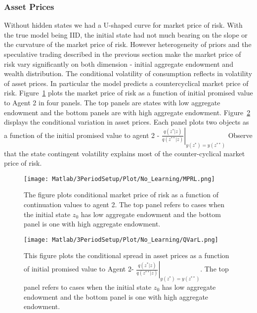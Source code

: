 \documentclass[12pt]{article}
\begin{document}
\subsubsection{Asset Prices}
\noindent Without hidden states we had a U-shaped curve for market price of risk. With the true model being IID, the initial state had not much bearing on the slope or the curvature of the market price of risk. However heterogeneity of priors and the speculative trading described in the previous section make the market price of risk vary significantly on both dimension - initial aggregate endowment and wealth distribution. The conditional volatility of consumption reflects in volatility of asset prices. In particular the model predicts a countercyclical market price of risk. Figure~\ref{fig:MPRL} plots the market price of risk as a function of initial promised value to Agent 2 in four panels. The top panels are states with low aggregate endowment and the bottom panels are with high aggregate endowment. Figure~\ref{fig:QVarL} displays the conditional variation in asset prices. Each panel plots two objects as a function of the initial promised value to agent 2 -  $ \left.\frac{q(z^*|z)}{q(z^{**}|z)}\right|_{y(z^*)=y(z^{**})}$ Observe that the state contingent volatility explains most of the counter-cyclical market price of risk.
\begin{figure}[htbp]
\centering
	  \texttt{[image: Matlab/3PeriodSetup/Plot/No\_Learning/MPRL.png]}

	\caption{ The figure plots conditional market price of risk as a function of continuation values to agent 2. The top panel refers to cases when the initial state $z_0$ has low aggregate endowment and the bottom panel is one with high aggregate endowment.}
	\label{fig:MPRL}
\end{figure} 
\begin{figure}[htbp]
\centering
	  \texttt{[image: Matlab/3PeriodSetup/Plot/No\_Learning/QVarL.png]}

	\caption{This figure plots the conditional spread in asset prices as a function of initial promised value to Agent 2-  $ \left.\frac{q(z^*|z)}{q(z^{**}|z)}\right|_{y(z^*)=y(z^{**})}$. The top panel refers to cases when the initial state $z_0$ has low aggregate endowment and the bottom panel is one with high aggregate endowment.}
	\label{fig:QVarL}
\end{figure} 
\end{document}
